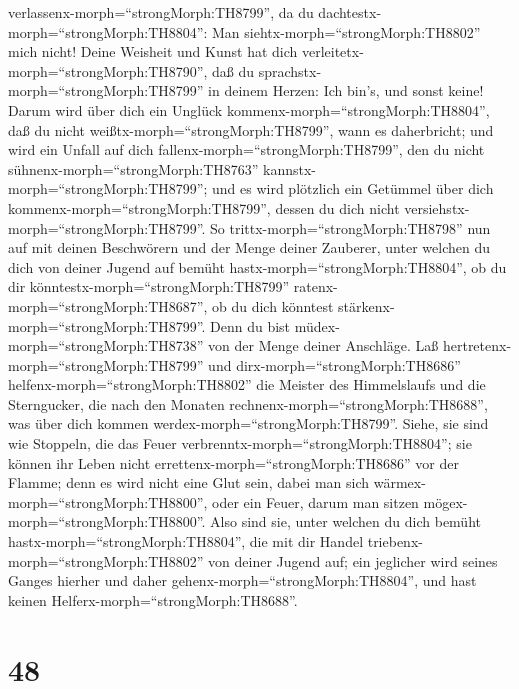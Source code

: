 verlassenx-morph=``strongMorph:TH8799'', da du
dachtestx-morph=``strongMorph:TH8804'': Man
siehtx-morph=``strongMorph:TH8802'' mich nicht! Deine Weisheit und Kunst
hat dich verleitetx-morph=``strongMorph:TH8790'', daß du
sprachstx-morph=``strongMorph:TH8799'' in deinem Herzen: Ich bin's, und
sonst keine!  Darum wird über dich ein Unglück
kommenx-morph=``strongMorph:TH8804'', daß du nicht
weißtx-morph=``strongMorph:TH8799'', wann es daherbricht; und wird ein
Unfall auf dich fallenx-morph=``strongMorph:TH8799'', den du nicht
sühnenx-morph=``strongMorph:TH8763''
kannstx-morph=``strongMorph:TH8799''; und es wird plötzlich ein Getümmel
über dich kommenx-morph=``strongMorph:TH8799'', dessen du dich nicht
versiehstx-morph=``strongMorph:TH8799''.  So
trittx-morph=``strongMorph:TH8798'' nun auf mit deinen Beschwörern und
der Menge deiner Zauberer, unter welchen du dich von deiner Jugend auf
bemüht hastx-morph=``strongMorph:TH8804'', ob du dir
könntestx-morph=``strongMorph:TH8799''
ratenx-morph=``strongMorph:TH8687'', ob du dich könntest
stärkenx-morph=``strongMorph:TH8799''.  Denn du bist
müdex-morph=``strongMorph:TH8738'' von der Menge deiner Anschläge. Laß
hertretenx-morph=``strongMorph:TH8799'' und
dirx-morph=``strongMorph:TH8686'' helfenx-morph=``strongMorph:TH8802''
die Meister des Himmelslaufs und die Sterngucker, die nach den Monaten
rechnenx-morph=``strongMorph:TH8688'', was über dich kommen
werdex-morph=``strongMorph:TH8799''.  Siehe, sie sind wie
Stoppeln, die das Feuer verbrenntx-morph=``strongMorph:TH8804''; sie
können ihr Leben nicht errettenx-morph=``strongMorph:TH8686'' vor der
Flamme; denn es wird nicht eine Glut sein, dabei man sich
wärmex-morph=``strongMorph:TH8800'', oder ein Feuer, darum man sitzen
mögex-morph=``strongMorph:TH8800''.  Also sind sie, unter
welchen du dich bemüht hastx-morph=``strongMorph:TH8804'', die mit dir
Handel triebenx-morph=``strongMorph:TH8802'' von deiner Jugend auf; ein
jeglicher wird seines Ganges hierher und daher
gehenx-morph=``strongMorph:TH8804'', und hast keinen
Helferx-morph=``strongMorph:TH8688''.

\hypertarget{section-47}{%
\section{48}\label{section-47}}

